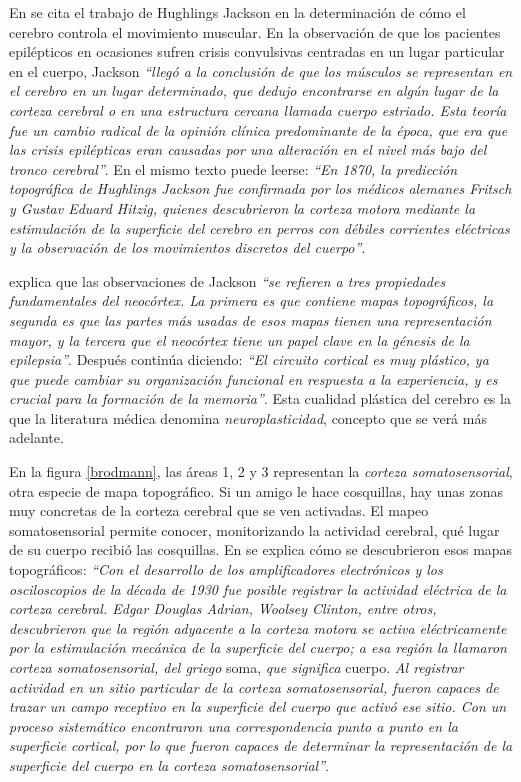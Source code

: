 En \cite{JohnAllman2000} se cita el trabajo de Hughlings Jackson en la determinación de cómo el cerebro controla el movimiento muscular. En la observación de que los pacientes epilépticos en ocasiones sufren crisis convulsivas centradas en un lugar particular en el cuerpo, Jackson {\it ``llegó a la conclusión de que los músculos se representan en el cerebro en un lugar determinado, que dedujo encontrarse en algún lugar de la corteza cerebral o en una estructura cercana llamada cuerpo estriado. Esta teoría fue un cambio radical de la opinión clínica predominante de la época, que era que las crisis epilépticas eran causadas por una alteración en el nivel más bajo del tronco cerebral''}. En el mismo texto puede leerse: {\it ``En 1870, la predicción topográfica de Hughlings Jackson fue confirmada por los médicos alemanes Fritsch y Gustav Eduard Hitzig, quienes descubrieron la corteza motora mediante la estimulación de la superficie del cerebro en perros con débiles corrientes eléctricas y la observación de los movimientos discretos del cuerpo''}. 

 \cite{JohnAllman2000} explica que las observaciones de Jackson {\it ``se refieren a tres propiedades fundamentales del neocórtex. La primera es que contiene mapas topográficos, la segunda es que las partes más usadas de esos mapas tienen una representación mayor, y la tercera que el neocórtex tiene un papel clave en la génesis de la epilepsia''}. Después continúa diciendo: {\it ``El circuito cortical es muy plástico, ya que puede cambiar su organización funcional en respuesta a la experiencia, y es crucial para la formación de la memoria''}. Esta cualidad plástica del cerebro es la que la literatura médica denomina {\it neuroplasticidad}, concepto que se verá más adelante. 

En la figura \ref{brodmann}, las áreas 1, 2 y 3 representan la {\it corteza somatosensorial}, otra especie de mapa topográfico. Si un amigo le hace cosquillas, hay unas zonas muy concretas de la corteza cerebral que se ven activadas. El mapeo somatosensorial permite conocer, monitorizando la actividad cerebral, qué lugar de su cuerpo recibió las cosquillas. En \cite{JohnAllman2000} se explica cómo se descubrieron esos mapas topográficos: {\it ``Con el desarrollo de los amplificadores electrónicos y los osciloscopios de la década de 1930 fue posible registrar la actividad eléctrica de la corteza cerebral. Edgar Douglas Adrian, Woolsey Clinton, entre otros, descubrieron que la región adyacente a la corteza motora se activa eléctricamente por la estimulación mecánica de la superficie del cuerpo; a esa región la llamaron corteza somatosensorial, del griego} soma, {\it que significa} cuerpo. {\it Al registrar actividad en un sitio particular de la corteza somatosensorial, fueron capaces de trazar un campo receptivo en la superficie del cuerpo que activó ese sitio. Con un proceso sistemático encontraron una correspondencia punto a punto en la superficie cortical, por lo que fueron capaces de determinar la representación de la superficie del cuerpo en la corteza somatosensorial''}.

